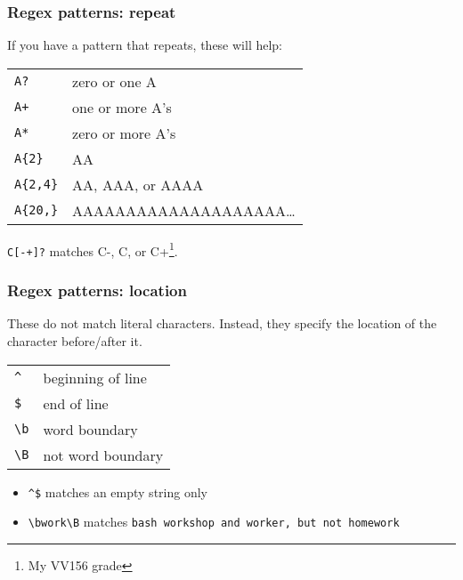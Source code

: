 \begin{frame}[fragile]
\frametitle{Regex patterns: repeat}
If you have a pattern that repeats, these will help:
\begin{table}
    \centering
    \begin{tabular}{ll}
        \verb|A?|           & zero or one A \\
        \verb|A+|           & one or more A's \\  %
        \verb|A*|           & zero or more A's \\ %
        \verb|A{2}|         & AA \\
        \verb|A{2,4}|       & AA, AAA, or AAAA \\
        \verb|A{20,}|       & AAAAAAAAAAAAAAAAAAAA… \\
    \end{tabular}
\end{table}

\begin{example}
    \verb|C[-+]?| matches C-, C, or C+\footnote{My VV156 grade}.
\end{example}
\end{frame}

\begin{frame}[fragile]
\frametitle{Regex patterns: location}
These do not match literal characters. Instead, they specify the location of
the character before/after it.
\begin{table}
    \centering
    \begin{tabular}{ll}
        \verb|^|            & beginning of line \\
        \verb|$|            & end of line \\
        \verb|\b|           & word boundary \\
        \verb|\B|           & not word boundary \\
    \end{tabular}
\end{table}

\begin{example}
    \begin{itemize}
        \item \verb|^$| matches an empty string only
        \item \verb|\bwork\B| matches \tt{bash workshop} and \tt{worker},
            but not \tt{homework}
    \end{itemize}
\end{example}
\end{frame}

